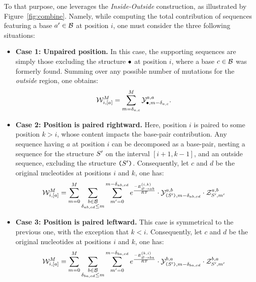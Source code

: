 To that purpose, one leverages the \emph{Inside-Outside} construction, as  illustrated by Figure~\ref{fig:combine}. Namely, while computing the total contribution of sequences featuring a base $a'\in\mathcal{B}$ at position $i$, one must consider the three following situations:
\begin{itemize}
\item {\bf Case 1: Unpaired position.} In this case, the supporting sequences are simply those excluding the structure $\bullet$ at position $i$, where a base $c\in\mathcal{B}$ was formerly found. Summing over any possible number of mutations for the \emph{outside} region, one obtains:
\begin{equation}
 \mathcal{W}^M_{\substack{i, [a]}} =  \sum_{m=\delta_{a,c}}^{M}
			\mathcal{Y}_{\bullet, m-\delta_{a,c}}^{a,a}.
\label{eq:combine_A}
\end{equation}
\item {\bf Case 2: Position is paired rightward.} Here, position $i$ is paired to some position $k>i$, whose content impacts the base-pair contribution. Any sequence having $a$ at position $i$ can be decomposed as a base-pair, nesting a sequence for the structure $S'$ on the interval $[i+1,k-1]$, and an outside sequence, excluding the structure $\text{\tt(}S'\text{\tt )}$.
Consequently, let $c$ and $d$ be the original nucleotides at positions $i$ and $k$, one has:
\begin{equation}
 \mathcal{W}^M_{\substack{i, [a]}} =  
			\sum_{m=0}^{M}
			\sum_{\substack{b\in \mathcal{B}\\\delta_{ab,cd}\leq m}}
			\sum_{m'=0}^{m-\delta_{ab,cd}}
     	 e^{\frac{-E^{(i,k)}_{{\varnothing}\to{ab}}}{RT}}
			\cdot\mathcal{Y}_{\text{\tt(}S'\text{\tt )}, m-\delta_{ab,cd}}^{a,b}
			\cdot\mathcal{Z}_{S', m'}^{a,b}
\label{eq:combine_B}
\end{equation}
\item {\bf Case 3: Position is paired leftward.} This case is symmetrical to the previous one, with the exception that $k<i$.
Consequently, let $c$ and $d$ be the original nucleotides at positions $i$ and $k$, one has:
\begin{equation}
 \mathcal{W}^M_{\substack{i, [a]}} =  
			\sum_{m=0}^{M}
			\sum_{\substack{b\in \mathcal{B}\\\delta_{ba,cd}\leq m}}
			\sum_{m'=0}^{m-\delta_{ba,cd}}
     	 e^{\frac{-E^{(k,i)}_{{\varnothing}\to{ba}}}{RT}}
			\cdot\mathcal{Y}_{\text{\tt(}S'\text{\tt )}, m-\delta_{ba,cd}}^{b,a}
			\cdot\mathcal{Z}_{S', m'}^{b,a}
\label{eq:combine_C}
\end{equation}
\end{itemize}

